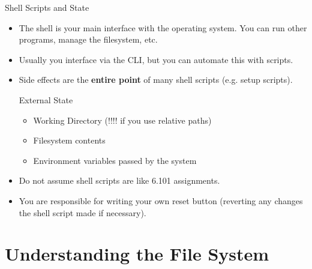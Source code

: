 \documentclass{../lecture}
\begin{document}
\begin{frame}{Shell Scripts and State}
  \begin{itemize}
    \item The shell is your main interface with the operating system. You can
      run other programs, manage the filesystem, etc.
    \item Usually you interface via the CLI, but you can automate this with
      scripts.
    \item Side effects are the \textbf{entire point} of many shell scripts (e.g.
      setup scripts).
      \begin{block}{External State}
        \begin{itemize}
          \item Working Directory (!!!! if you use relative paths)
          \item Filesystem contents
          \item Environment variables passed by the system
        \end{itemize}
      \end{block}
    \item Do not assume shell scripts are like 6.101 assignments.
    \item You are responsible for writing your own reset button (reverting any
      changes the shell script made if necessary).
  \end{itemize}
\end{frame}

\section{Understanding the File System}
\end{document}
